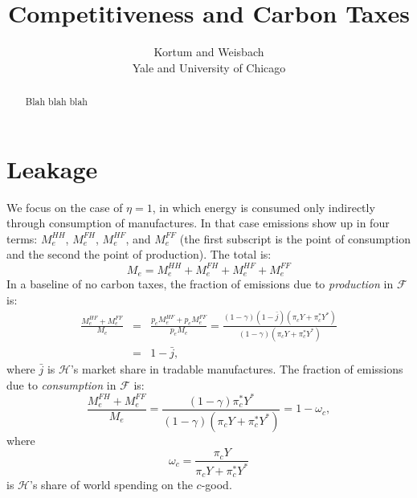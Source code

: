 \documentclass[notitlepage,12pt]{article}
\begin{document}
\title{Competitiveness and Carbon Taxes}
\author{Kortum and Weisbach \\
Yale and University of Chicago}
\maketitle

\begin{abstract}
Blah blah blah
\end{abstract}

\section{Leakage}

We focus on the case of $\eta =1$, in which energy is consumed only
indirectly through consumption of manufactures. In that case emissions show
up in four terms: $M_{e}^{HH}$, $M_{e}^{FH}$, $M_{e}^{HF}$, and $M_{e}^{FF}$
(the first subscript is the point of consumption and the second the point of
production). The total is:%
\begin{equation*}
M_{e}=M_{e}^{HH}+M_{e}^{FH}+M_{e}^{HF}+M_{e}^{FF}
\end{equation*}%
In a baseline of no carbon taxes, the fraction of emissions due to \emph{%
production} in $\mathcal{F}$ is:%
\begin{eqnarray*}
\frac{M_{e}^{HF}+M_{e}^{FF}}{M_{e}} &=&\frac{p_{e}M_{e}^{HF}+p_{e}M_{e}^{FF}%
}{p_{e}M_{e}}=\frac{\left( 1-\gamma \right) \left( 1-\bar{j}\right) \left(
\pi _{c}Y+\pi _{c}^{\ast }Y^{\ast }\right) }{\left( 1-\gamma \right) \left(
\pi _{c}Y+\pi _{c}^{\ast }Y^{\ast }\right) } \\
&=&1-\bar{j},
\end{eqnarray*}%
where $\bar{j}$ is $\mathcal{H}$'s market share in tradable manufactures.
The fraction of emissions due to \emph{consumption} in $\mathcal{F}$ is:%
\begin{equation*}
\frac{M_{e}^{FH}+M_{e}^{FF}}{M_{e}}=\frac{\left( 1-\gamma \right) \pi
_{c}^{\ast }Y^{\ast }}{\left( 1-\gamma \right) \left( \pi _{c}Y+\pi
_{c}^{\ast }Y^{\ast }\right) }=1-\omega _{c},
\end{equation*}%
where%
\begin{equation*}
\omega _{c}=\frac{\pi _{c}Y}{\pi _{c}Y+\pi _{c}^{\ast }Y^{\ast }}
\end{equation*}%
is $\mathcal{H}$'s share of world spending on the $c$-good.
\end{document}
